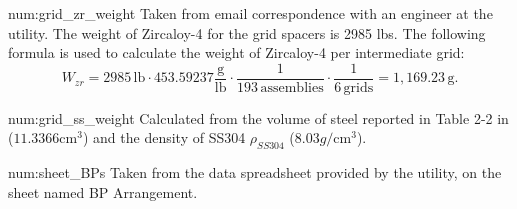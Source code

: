 \begin{numitem}{num:grid_zr_weight}
  Taken from email correspondence with an engineer at the utility. The weight of Zircaloy-4 for the grid spacers is 2985 lbs. The following formula is used to calculate the weight of Zircaloy-4 per intermediate grid:
\[
    W_{zr} = 2985\,\mathrm{lb} \cdot 453.59237\mathrm{\frac{g}{lb}} \cdot \frac{1}{193\,\mathrm{assemblies}} \cdot \frac{1}{6\,\mathrm{grids}} = 1,169.23\,\mathrm{g}.
\]
\end{numitem}

\begin{numitem}{num:grid_ss_weight}
  Calculated from the volume of steel reported in Table 2-2 in
  \cite{ml033530020} ($11.3366 \mathrm{cm}^3$) and the density of
  SS304 $\rho_{SS304}$ ($8.03 g/\mathrm{cm}^3$).
  
\end{numitem}

\begin{numitem}{num:sheet_BPs}
  Taken from the data spreadsheet provided by the utility, on the sheet named BP Arrangement.
\end{numitem}

